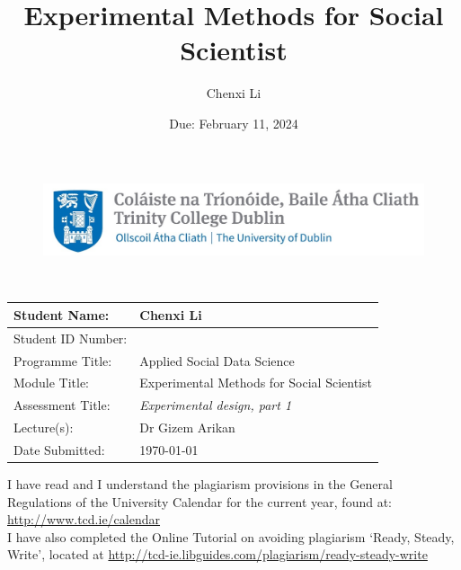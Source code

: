 \documentclass[12pt]{article} %
\title{Experimental Methods for Social Scientist }
\date{Due: February 11, 2024}
\author{Chenxi Li}
\begin{document}
\begin{figure}[h]
	\centering
	\vspace{-2.5cm}
	\hspace{-8cm}
	\includegraphics[width=12cm]{Trinity_icon.jpg}  
\end{figure}

\vspace{.5cm}
\begin{center}
\\
\end{center}

\vspace{.7cm}


\begin{center}
		\begin{tabular}{|>{\arraybackslash}p{4cm}|>{\arraybackslash}p{8cm}|}
			\hline
			Student Name: & Chenxi Li\\
			\hline
			Student ID Number: & 23330541 \\
			\hline
			Programme Title: & Applied Social Data Science \\
			\hline
			Module Title: & Experimental Methods for Social Scientist \\
			\hline
			Assessment Title: & \textit{Experimental design, part 1 }\\
			\hline
			Lecture(s): & Dr Gizem Arikan \\
			\hline
			Date Submitted: & \today \\
			\hline
		\end{tabular}
\end{center}

\vspace{.7cm}

\noindent I have read and I understand the plagiarism provisions in the General Regulations of the University Calendar for the current year, found at:  \url{http://www.tcd.ie/calendar} \\

\noindent I have also completed the Online Tutorial on avoiding plagiarism ‘Ready, Steady, Write’, located at \url{http://tcd-ie.libguides.com/plagiarism/ready-steady-write} \\
\end{document}
